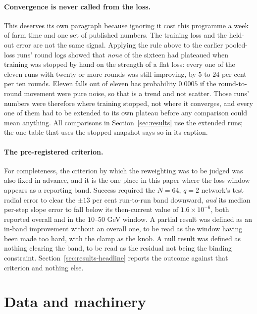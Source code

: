 \documentclass[11pt,a4paper]{article}
\begin{document}
\paragraph{Convergence is never called from the loss.} This deserves its own
paragraph because ignoring it cost this programme a week of farm time and one
set of published numbers. The training loss and the held-out error are not the
same signal. Applying the rule above to the earlier pooled-loss runs' round
logs showed that \emph{none} of the sixteen had plateaued when training was
stopped by hand on the strength of a flat loss: every one of the eleven runs
with twenty or more rounds was still improving, by $5$ to $24$ per cent per ten
rounds. Eleven falls out of eleven has probability $0.0005$ if the round-to-
round movement were pure noise, so that is a trend and not scatter. Those runs'
numbers were therefore where training stopped, not where it converges, and
every one of them had to be extended to its own plateau before any comparison
could mean anything. All comparisons in Section~\ref{sec:results} use the
extended runs; the one table that uses the stopped snapshot says so in its
caption.

\paragraph{The pre-registered criterion.} For completeness, the criterion by
which the reweighting was to be judged was also fixed in advance, and it is the
one place in this paper where the loss window appears as a reporting band.
Success required the $N = 64$, $q = 2$ network's test radial error to clear the
$\pm 13$ per cent run-to-run band downward, \emph{and} its median per-step
slope error to fall below its then-current value of $1.6\times10^{-6}$, both
reported overall and in the $10$--$50$ GeV window. A partial result was defined
as an in-band improvement without an overall one, to be read as the window
having been made too hard, with the clamp as the knob. A null result was
defined as nothing clearing the band, to be read as the residual not being the
binding constraint. Section~\ref{sec:results-headline} reports the outcome
against that criterion and nothing else.


\section{Data and machinery}
\label{sec:data}
\end{document}
